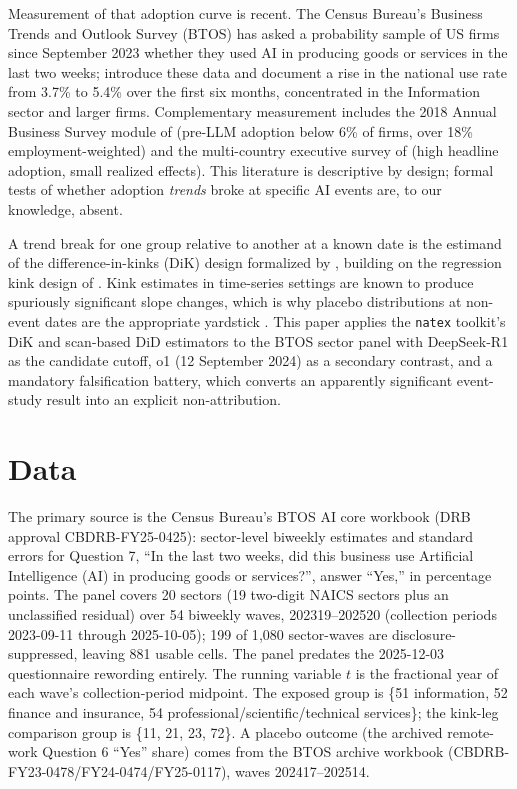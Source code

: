 \documentclass[11pt]{article}
\newcommand{\natex}{\texttt{natex}}
\begin{document}
Measurement of that adoption curve is recent. The Census Bureau's Business
Trends and Outlook Survey (BTOS) has asked a probability sample of US firms
since September 2023 whether they used AI in producing goods or services in the
last two weeks; \cite{bonney2024} introduce these data and document a rise in
the national use rate from 3.7\% to 5.4\% over the first six months,
concentrated in the Information sector and larger firms. Complementary
measurement includes the 2018 Annual Business Survey module of
\cite{mcelheran2024} (pre-LLM adoption below 6\% of firms, over 18\%
employment-weighted) and the multi-country executive survey of
\cite{yotzov2026} (high headline adoption, small realized effects). This
literature is descriptive by design; formal tests of whether adoption
\emph{trends} broke at specific AI events are, to our knowledge, absent.

A trend break for one group relative to another at a known date is the estimand
of the difference-in-kinks (DiK) design formalized by \cite{bockerman2025},
building on the regression kink design of \cite{card2015}. Kink estimates in
time-series settings are known to produce spuriously significant slope changes,
which is why placebo distributions at non-event dates are the appropriate
yardstick \cite{ganong2018}. This paper applies the \natex{} toolkit's DiK and
scan-based DiD estimators \cite{natex,herlands2018} to the BTOS sector panel
with DeepSeek-R1 as the candidate cutoff, o1 (12 September 2024) as a secondary
contrast, and a mandatory falsification battery, which converts an apparently
significant event-study result into an explicit non-attribution.

\section{Data}\label{sec:data}

The primary source is the Census Bureau's BTOS AI core workbook (DRB approval
CBDRB-FY25-0425): sector-level biweekly estimates and standard errors for
Question 7, ``In the last two weeks, did this business use Artificial
Intelligence (AI) in producing goods or services?'', answer ``Yes,'' in
percentage points. The panel covers 20 sectors (19 two-digit NAICS sectors plus
an unclassified residual) over 54 biweekly waves, 202319--202520 (collection
periods 2023-09-11 through 2025-10-05); 199 of 1{,}080 sector-waves are
disclosure-suppressed, leaving 881 usable cells. The panel predates the
2025-12-03 questionnaire rewording entirely. The running variable $t$ is the
fractional year of each wave's collection-period midpoint. The exposed group is
\{51 information, 52 finance and insurance, 54 professional/scientific/technical
services\}; the kink-leg comparison group is \{11, 21, 23, 72\}. A placebo
outcome (the archived remote-work Question 6 ``Yes'' share) comes from the BTOS
archive workbook (CBDRB-FY23-0478/FY24-0474/FY25-0117), waves 202417--202514.
\end{document}

